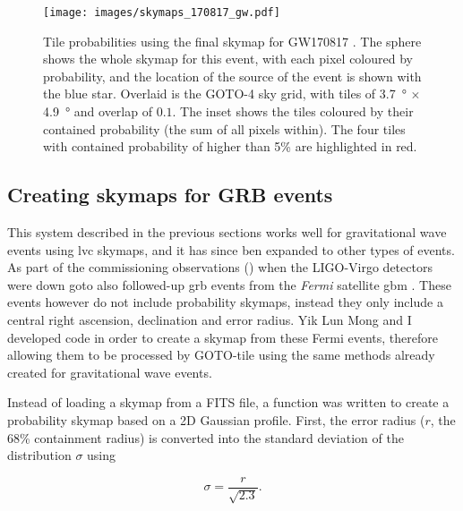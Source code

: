 \begin{colsection}
\begin{colsection}
\begin{figure}[p]
\begin{center}
\texttt{[image: images/skymaps\_170817\_gw.pdf]}
\end{center}
\caption[Tile probabilities for GW170817]{Tile probabilities using the final skymap for GW170817 \citep{GW170817}. The sphere shows the whole skymap for this event, with each pixel coloured by probability, and the location of the source of the event is shown with the blue star. Overlaid is the GOTO-4 sky grid, with tiles of \SI{3.7}{\degree} $\times$ \SI{4.9}{\degree} and overlap of $0.1$. The inset shows the tiles coloured by their contained probability (the sum of all pixels within). The four tiles with contained probability of higher than 5\% are highlighted in red.
}
\label{fig:170817_gw}
\end{figure}

\clearpage

\end{colsection}


\subsection{Creating skymaps for GRB events}
\label{sec:gaussian_skymaps}
\begin{colsection}

This system described in the previous sections works well for gravitational wave events using \gls{lvc} skymaps, and it has since ben expanded to other types of events. As part of the commissioning observations () when the LIGO-Virgo detectors were down \gls{goto} also followed-up \gls{grb} events from the \textit{Fermi} satellite \gls{gbm} \citep{Fermi_GBM}. These events however do not include probability skymaps, instead they only include a central right ascension, declination and error radius. Yik Lun Mong and I developed code in order to create a skymap from these Fermi events, therefore allowing them to be processed by GOTO-tile using the same methods already created for gravitational wave events.

Instead of loading a skymap from a FITS file, a function was written to create a probability skymap based on a 2D Gaussian profile. First, the error radius ($r$, the 68\% containment radius) is converted into the standard deviation of the distribution $\sigma$ using

\begin{equation}
    \sigma = \frac{r}{\sqrt{2.3}}.
    \label{eq:gaussian_sigma}
\end{equation}


\end{colsection}
\end{colsection}
